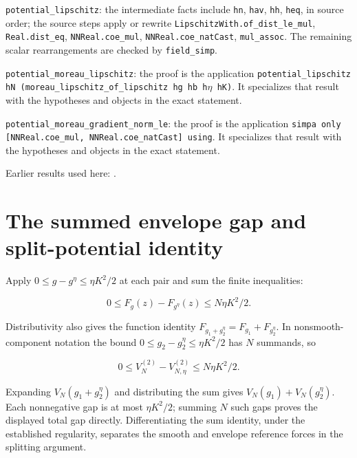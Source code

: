\documentclass[11pt,a4paper]{article}
\begin{document}
\begin{leanbox}
\texttt{potential\_\allowbreak{}lipschitz}: the intermediate facts include \texttt{hn}, \texttt{hav}, \texttt{hh}, \texttt{heq}, in source order; the source steps apply or rewrite \texttt{Lipschitz\allowbreak{}With.\allowbreak{}of\_\allowbreak{}dist\_\allowbreak{}le\_\allowbreak{}mul}, \texttt{Real.\allowbreak{}dist\_\allowbreak{}eq}, \texttt{NNReal.\allowbreak{}coe\_\allowbreak{}mul}, \texttt{NNReal.\allowbreak{}coe\_\allowbreak{}nat\allowbreak{}Cast}, \texttt{mul\_\allowbreak{}assoc}. The remaining scalar rearrangements are checked by \texttt{field\_\allowbreak{}simp}.



\texttt{potential\_\allowbreak{}moreau\_\allowbreak{}lipschitz}: the proof is the application \texttt{potential\_\allowbreak{}lipschitz h\allowbreak{}N (moreau\_\allowbreak{}lipschitz\_\allowbreak{}of\_\allowbreak{}lipschitz hg hb h\ensuremath{\eta} h\allowbreak{}K)}. It specializes that result with the hypotheses and objects in the exact statement.



\texttt{potential\_\allowbreak{}moreau\_\allowbreak{}gradient\_\allowbreak{}norm\_\allowbreak{}le}: the proof is the application \texttt{simpa only [NNReal.\allowbreak{}coe\_\allowbreak{}mul, NNReal.\allowbreak{}coe\_\allowbreak{}nat\allowbreak{}Cast] using}. It specializes that result with the hypotheses and objects in the exact statement.
\end{leanbox}


Earlier results used here: \cite[Section~3.1.1]{LangevinLean2026IPLA}.

\section{\texorpdfstring{The summed envelope gap and split-potential identity}{The summed envelope gap and split-potential identity}}


Apply \(0\le g-g^\eta\le\eta K^2/2\) at each pair and sum the finite inequalities:

\[0\le F_g(z)-F_{g^\eta}(z)\le N\eta K^2/2.\]

Distributivity also gives the function identity \(F_{g_1+g_2^\eta}=F_{g_1}+F_{g_2^\eta}\). In nonsmooth-component notation the bound \(0\le g_2-g_2^\eta\le\eta K^2/2\) has \(N\) summands, so

\[0\le V_N^{(2)}-V_{N,\eta}^{(2)}\le N\eta K^2/2.\]

Expanding \(V_N(g_1+g_2^\eta)\) and distributing the sum gives \(V_N(g_1)+V_N(g_2^\eta)\). Each nonnegative gap is at most \(\eta K^2/2\); summing \(N\) such gaps proves the displayed total gap directly. Differentiating the sum identity, under the established regularity, separates the smooth and envelope reference forces in the splitting argument.
\end{document}
